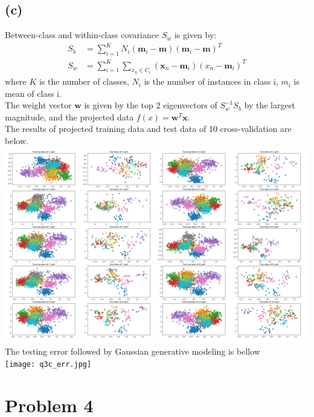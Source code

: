 \documentclass[a4paper]{article}
\begin{document}
\subsection{(c)}
Between-class and within-class covariance $S_{w}$ is given by:
\begin{align*}
    S_{b} &= \sum_{i=1}^{K}N_{i}(\mathbf{m}_{i}-\mathbf{m})(\mathbf{m}_{i}-\mathbf{m})^{T}\\
    S_{w} &= \sum_{i=1}^{K}\sum_{x_{n}\in C_{i}}(\mathbf{x}_{n}-\mathbf{m}_{i})(x_{n}-\mathbf{m}_{i})^{T}
\end{align*}
where $K$ is the number of classes, $N_{i}$ is the number of instances in class i, $m_{i}$ is mean of class i.\\
The weight vector $\mathbf{w}$ is given by the top 2 eigenvectors of $S_{w}^{-1}S_{b}$ by the largest magnitude, and the projected data $f(x) = \mathbf{w}^{T}\mathbf{x}$. \\
The results of projected training data and test data of 10 cross-validation are below.\\
\includegraphics[width=\textwidth]{q3c.png}\\
The testing error followed by Gaussian generative modeling is bellow\\
\texttt{[image: q3c\_err.jpg]}
\section{Problem 4}
\end{document}
